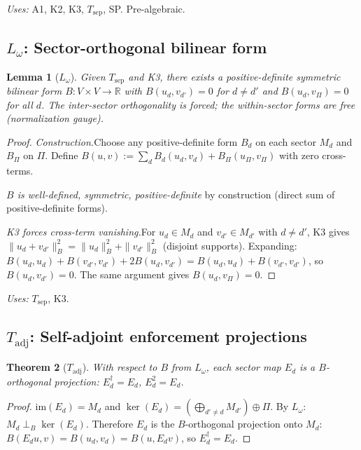 \documentclass[11pt,a4paper]{article}
\newtheorem{theorem_app}{Theorem}[section]
\newtheorem{lemma_app}[theorem_app]{Lemma}
\theoremstyle{definition}
\begin{document}
\noindent\textit{Uses:} A1, K2, K3, $T_{\mathrm{sep}}$, SP.
Pre-algebraic.


\subsection{$L_\omega$: Sector-orthogonal bilinear form}
\label{app:Lomega}

\begin{lemma_app}[$L_\omega$]
Given $T_{\mathrm{sep}}$ and K3, there exists a positive-definite
symmetric bilinear form $B: V \times V \to \mathbb{R}$ with
$B(u_d, v_{d'}) = 0$ for $d \ne d'$ and $B(u_d, v_\Pi) = 0$ for
all $d$.  The inter-sector orthogonality is forced; the within-sector
forms are free (normalization gauge).
\end{lemma_app}

\begin{proof}
\textit{Construction.}\quad Choose any positive-definite form $B_d$ on
each sector $M_d$ and $B_\Pi$ on $\Pi$.  Define
$B(u,v) := \sum_d B_d(u_d, v_d) + B_\Pi(u_\Pi, v_\Pi)$
with zero cross-terms.

\textit{$B$ is well-defined, symmetric, positive-definite} by
construction (direct sum of positive-definite forms).

\textit{K3 forces cross-term vanishing.}\quad For $u_d \in M_d$ and
$v_{d'} \in M_{d'}$ with $d \ne d'$, K3 gives
$\|u_d + v_{d'}\|_B^2 = \|u_d\|_B^2 + \|v_{d'}\|_B^2$ (disjoint
supports).  Expanding: $B(u_d, u_d) + B(v_{d'}, v_{d'}) +
2B(u_d, v_{d'}) = B(u_d, u_d) + B(v_{d'}, v_{d'})$, so
$B(u_d, v_{d'}) = 0$.  The same argument gives
$B(u_d, v_\Pi) = 0$.
\end{proof}

\noindent\textit{Uses:} $T_{\mathrm{sep}}$, K3.


\subsection{$T_{\mathrm{adj}}$: Self-adjoint enforcement projections}
\label{app:Tadj}

\begin{theorem_app}[$T_{\mathrm{adj}}$]
With respect to $B$ from $L_\omega$, each sector map $E_d$ is a
$B$-orthogonal projection: $E_d^\dagger = E_d$, $E_d^2 = E_d$.
\end{theorem_app}

\begin{proof}
$\mathrm{im}(E_d) = M_d$ and
$\ker(E_d) = (\bigoplus_{d' \ne d} M_{d'}) \oplus \Pi$.
By $L_\omega$: $M_d \perp_B \ker(E_d)$.  Therefore $E_d$ is the
$B$-orthogonal projection onto $M_d$:
$B(E_d u, v) = B(u_d, v_d) = B(u, E_d v)$, so $E_d^\dagger = E_d$.
\end{proof}
\end{document}
